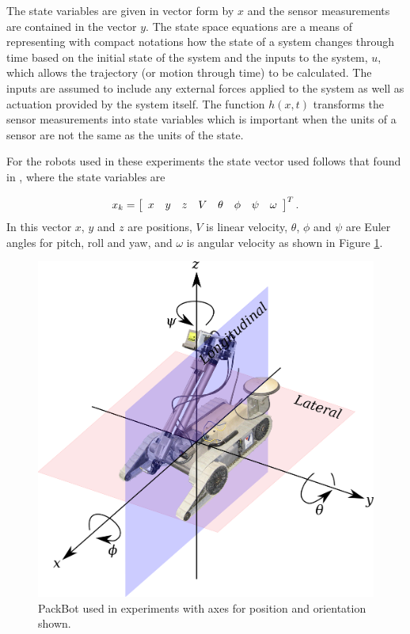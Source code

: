 The state variables are given in vector form by $x$ and the sensor measurements are contained in the vector $y$. The state space equations are a means of representing with compact notations how the state of a system changes through time based on the initial state of the system and the inputs to the system, $u$, which allows the trajectory (or motion through time) to be calculated. The inputs are assumed to include any external forces applied to the system as well as actuation provided by the system itself. The function $h(x,t)$ transforms the sensor measurements into state variables which is important when the units of a sensor are not the same as the units of the state.

For the robots used in these experiments the state vector used follows that found in \cite{Kelly_1994_338}, \cite{Kelly_1994_333} where the state variables are

\begin{align*}
x_k = \left[\begin{array}{c c c c c c c c} x & y & z & V & \theta & \phi & \psi & \omega \end{array}\right]^T.
\end{align*}
In this vector $x$, $y$ and $z$ are positions, $V$ is linear velocity, $\theta$, $\phi$ and $\psi$ are Euler angles for pitch, roll and yaw, and $\omega$ is angular velocity as shown in Figure \ref{fig:robotaxes}.

\begin{figure}[ht!]
    \centering
    \includegraphics[width=.8\textwidth]{images/packbotaxes}
    \caption{PackBot used in experiments with axes for position and orientation shown.}
    \label{fig:robotaxes}
\end{figure}

